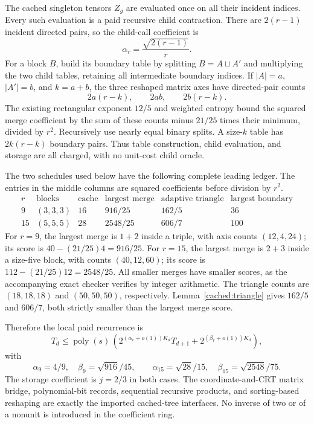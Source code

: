 The cached singleton tensors $Z_g$ are evaluated once on all their incident
indices. Every such evaluation is a paid recursive child contraction.
There are $2(r-1)$ incident directed pairs, so the child-call coefficient is
\[
 \alpha_r=\frac{\sqrt{2(r-1)}}r.
\]
For a block $B$, build its boundary table by splitting $B=A\sqcup A'$ and
multiplying the two child tables, retaining all intermediate boundary
indices. If $|A|=a$, $|A'|=b$, and $k=a+b$, the three reshaped matrix axes
have directed-pair counts
\[
 2a(r-k),\qquad 2ab,\qquad 2b(r-k).
\]
The existing rectangular exponent $12/5$ and weighted entropy bound the
squared merge coefficient by the sum of these counts minus $21/25$ times
their minimum, divided by $r^2$. Recursively use nearly equal binary
splits. A size-$k$ table has $2k(r-k)$ boundary pairs. Thus table construction,
child evaluation, and storage are all charged, with no unit-cost child oracle.

The two schedules used below have the following complete leading ledger.
The entries in the middle columns are squared coefficients before division
by $r^2$.
\[
\begin{array}{c|c|c|c|c|c}
 r&\text{blocks}&\text{cache}&\text{largest merge}&\text{adaptive triangle}&
 \text{largest boundary}\\ \hline
 9&(3,3,3)&16&916/25&162/5&36\\
 15&(5,5,5)&28&2548/25&606/7&100
\end{array}
\]
For $r=9$, the largest merge is $1+2$ inside a triple, with axis counts
$(12,4,24)$; its score is $40-(21/25)4=916/25$.
For $r=15$, the largest merge is $2+3$ inside a size-five block, with
counts $(40,12,60)$; its score is $112-(21/25)12=2548/25$.
All smaller merges have smaller scores, as the accompanying exact checker
verifies by integer arithmetic. The triangle counts are $(18,18,18)$ and
$(50,50,50)$, respectively. Lemma~\ref{cached:triangle} gives $162/5$
and $606/7$, both strictly smaller than the largest merge score.

Therefore the local paid recurrence is
\[
 T_d\le \operatorname{poly}(s)\,
 \left(2^{(\alpha_r+o(1))K_d}T_{d+1}
       +2^{(\beta_r+o(1))K_d}\right),
\]
with
\[
 \alpha_9=4/9,\quad \beta_9=\sqrt{916}/45,\qquad
 \alpha_{15}=\sqrt{28}/15,\quad \beta_{15}=\sqrt{2548}/75.
\]
The storage coefficient is $j=2/3$ in both cases. The coordinate-and-CRT
matrix bridge, polynomial-bit records, sequential recursive products, and
sorting-based reshaping are exactly the imported cached-tree interfaces.
No inverse of two or of a nonunit is introduced in the coefficient ring.

